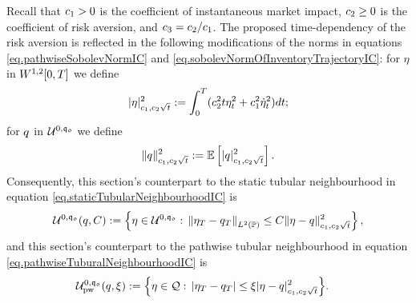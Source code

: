 \documentclass[10pt,a4paper]{article}
\begin{document}
	
	Recall that $\coeffMarketImpact>0$ is the coefficient of instantaneous market impact, $\coeffRiskAversion\geq 0$ is the coefficient of risk aversion, and $\ratioAversionOverImpact=\coeffRiskAversion/\coeffMarketImpact$. The proposed time-dependency of the risk aversion is reflected in the following modifications of the norms in equations \eqref{eq.pathwiseSobolevNormIC} and \eqref{eq.sobolevNormOfInventoryTrajectoryIC}: for $\eta$ in $\sobolevSpaceOneTwo\timeWindow$ we define
	\begin{equation}\label{eq.pathwiseSobolevNormTimeIC}
	\lvert \eta \rvert \squared _{\coeffMarketImpact,\coeffRiskAversion\sqrt{t}}:= \intZeroTimeHorizon (\coeffRiskAversion\squared t \eta\squared_t + \coeffMarketImpact\squared \dotEta\squared_t) dt;
	\end{equation}
	for $\inventory$ in $\spaceUnbiasedInventoryTrajectoriesInitialConstraint$ we define
	\begin{equation}\label{eq.sobolevNormTimeIC}
	\lVert \inventory \rVert\squared_{\coeffMarketImpact,\coeffRiskAversion\sqrt{t} }
	:=
	\Expectation \left[ \lvert \inventory \rvert_{\coeffMarketImpact,\coeffRiskAversion\sqrt{t}}\squared \right].
	\end{equation}
	Consequently, this section's counterpart to the static tubular neighbourhood in equation \eqref{eq.staticTubularNeighbourhoodIC} is  
	\begin{equation}\label{eq.staticTubularNeighbourhoodTimeIC}
	\spaceUnbiasedInventoryTrajectoriesInitialConstraint (\inventory, C):=
	\left\lbrace
	\eta \in \spaceUnbiasedInventoryTrajectoriesInitialConstraint: \, 
	\norm[\eta_\timeHorizon -\inventory_\timeHorizon]_{\Ltwo(\Prob)} \leq 
	C \lVert \eta -\inventory\rVert\squared_{\coeffMarketImpact,\coeffRiskAversion\sqrt{t} }
	\right\rbrace,
	\end{equation}
	and  this section's counterpart to the pathwise tubular neighbourhood in equation \eqref{eq.pathwiseTuburalNeighbourhoodIC} is 
	\begin{equation}
	\begin{split}\label{eq.pathwiseTubularNeighbourhoodTimeIC}
	\spaceUnbiasedInventoryTrajectoriesInitialConstraint_{\text{pw}}(\inventory,\xi):=
	\Big\lbrace
	\eta \in \spaceInventoryTrajectories: \, 
	\abs{\eta_\timeHorizon-\inventory_\timeHorizon} 
	&\leq \xi\lvert \eta - \inventory\rvert \squared_{\coeffMarketImpact,\coeffRiskAversion\sqrt{t} }
	\Big\rbrace.
	\end{split}
	\end{equation}
	
\end{document}
